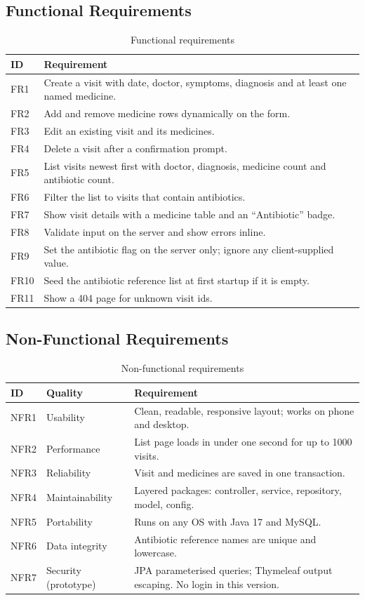 \documentclass[11pt,a4paper]{article}
\begin{document}
\subsection{Functional Requirements}
\begin{table}[H]
\centering
\caption{Functional requirements}
\begin{tabularx}{\textwidth}{lY}
\toprule
\textbf{ID} & \textbf{Requirement}\\
\midrule
FR1 & Create a visit with date, doctor, symptoms, diagnosis and at least one named medicine.\\
FR2 & Add and remove medicine rows dynamically on the form.\\
FR3 & Edit an existing visit and its medicines.\\
FR4 & Delete a visit after a confirmation prompt.\\
FR5 & List visits newest first with doctor, diagnosis, medicine count and antibiotic count.\\
FR6 & Filter the list to visits that contain antibiotics.\\
FR7 & Show visit details with a medicine table and an ``Antibiotic'' badge.\\
FR8 & Validate input on the server and show errors inline.\\
FR9 & Set the antibiotic flag on the server only; ignore any client-supplied value.\\
FR10 & Seed the antibiotic reference list at first startup if it is empty.\\
FR11 & Show a 404 page for unknown visit ids.\\
\bottomrule
\end{tabularx}
\end{table}

\subsection{Non-Functional Requirements}
\begin{table}[H]
\centering
\caption{Non-functional requirements}
\begin{tabularx}{\textwidth}{lYY}
\toprule
\textbf{ID} & \textbf{Quality} & \textbf{Requirement}\\
\midrule
NFR1 & Usability & Clean, readable, responsive layout; works on phone and desktop.\\
NFR2 & Performance & List page loads in under one second for up to 1000 visits.\\
NFR3 & Reliability & Visit and medicines are saved in one transaction.\\
NFR4 & Maintainability & Layered packages: controller, service, repository, model, config.\\
NFR5 & Portability & Runs on any OS with Java 17 and MySQL.\\
NFR6 & Data integrity & Antibiotic reference names are unique and lowercase.\\
NFR7 & Security (prototype) & JPA parameterised queries; Thymeleaf output escaping. No login in this version.\\
\bottomrule
\end{tabularx}
\end{table}
\end{document}

